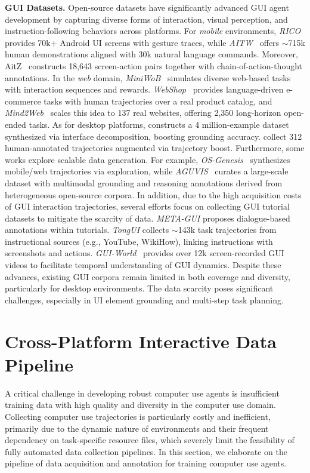 \documentclass{article} %
\begin{document}
\textbf{GUI Datasets.} 
% 
Open-source datasets have significantly advanced GUI agent development by capturing diverse forms of interaction, visual perception, and instruction-following behaviors across platforms. For \textit{mobile} environments, \textit{RICO}~\citep{deka2017rico} provides 70k+ Android UI screens with gesture traces, while \textit{AITW}~\citep{rawles2023androidinthewild} offers $\sim$715k human demonstrations aligned with 30k natural language commands. Moreover, AitZ~\citep{zhang2024aitz} constructs 18,643 screen-action pairs together with chain-of-action-thought annotations.
% 
In the \textit{web} domain, \textit{MiniWoB}~\citep{Tianlin2017miniwob} simulates diverse web-based tasks with interaction sequences and rewards.
\textit{WebShop}~\citep{shunyu2022webshop} provides language-driven e-commerce tasks with human trajectories over a real product catalog, and \textit{Mind2Web}~\citep{deng2023mind2web} scales this idea to 137 real websites, offering 2,350 long-horizon open-ended tasks.
% 
As for desktop platforms, \cite{xie2024osworld} constructs a 4 million‑example dataset synthesized via interface decomposition, boosting grounding accuracy. 
% 
\cite{he2025efficientagenttrainingcomputer} collect 312 human-annotated trajectories augmented via trajectory boost.
% 
Furthermore, some works explore scalable data generation. For example, \textit{OS-Genesis}~\citep{sun2024osgenesis} synthesizes mobile/web trajectories via exploration, while \textit{AGUVIS}~\citep{xu2024aguvis} curates a large-scale dataset with multimodal grounding and reasoning annotations derived from heterogeneous open-source corpora. 
% 
In addition, due to the high acquisition costs of GUI interaction trajectories, several efforts focus on collecting GUI tutorial datasets to mitigate the scarcity of data.
% 
\textit{META-GUI}\citep{sun2022meta} proposes dialogue-based annotations within tutorials. \textit{TongUI}\citep{zhang2025tongui} collects $\sim$143k task trajectories from instructional sources (e.g., YouTube, WikiHow), linking instructions with screenshots and actions. \textit{GUI-World}~\citep{chen2024guiworld} provides over 12k screen-recorded GUI videos to facilitate temporal understanding of GUI dynamics.
% 
Despite these advances, existing GUI corpora remain limited in both coverage and diversity, particularly for desktop environments. The data scarcity poses significant challenges, especially in UI element grounding and multi-step task planning.

\section{Cross-Platform Interactive Data Pipeline}
\label{sec:data_pipeline}
A critical challenge in developing robust computer use agents is insufficient training data with high quality and diversity in the computer use domain. 
Collecting computer use trajectories is particularly costly and inefficient, primarily due to the dynamic nature of environments and their frequent dependency on task-specific resource files, which severely limit the feasibility of fully automated data collection pipelines. In this section, we elaborate on the pipeline of data acquisition and annotation for training computer use agents.
\end{document}
